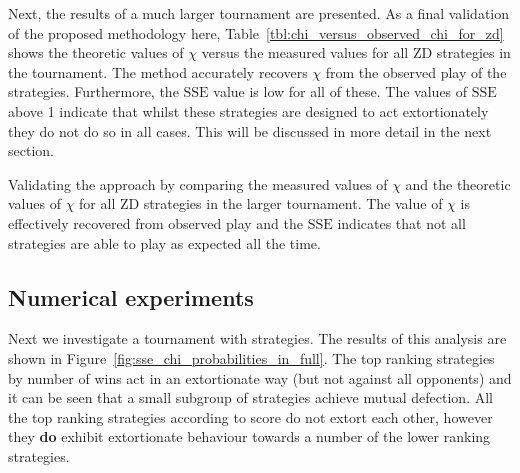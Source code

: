 \documentclass[a4paper]{article}
\newcommand{\SSe}{\text{SSE}}
\begin{document}
Next, the results of a much larger tournament are presented.
As a final validation of the proposed methodology here,
Table~\ref{tbl:chi_versus_observed_chi_for_zd} shows the theoretic values of
\(\chi\) versus the measured values for all ZD strategies in the tournament.
The method accurately recovers \(\chi\) from the observed play of
the strategies. Furthermore, the \(\SSe\) value is low for all of these. The
values of \(\SSe\) above 1 indicate that whilst these strategies are designed to
act extortionately they do not do so in all cases. This will be discussed in
more detail in the next section.

\begin{table}[!hbtp]
    \begin{center}
   
    \end{center}
    \caption{Validating the approach by comparing the measured values of
    \(\chi\) and the theoretic values of
    \(\chi\) for all ZD strategies in the larger tournament. The value of
    \(\chi\) is effectively recovered from observed play and the \(\SSe\)
    indicates that not all strategies are able to play as expected all the
time.}
    \label{tbl:chi_versus_observed_chi_for_zd}
\end{table}

\subsection{Numerical experiments}

Next we investigate a tournament with
strategies. The results of
this analysis are shown in Figure~\ref{fig:sse_chi_probabilities_in_full}. The
top ranking strategies by number of wins act in an extortionate way (but not
against all opponents) and it can be seen that a small subgroup of strategies
achieve mutual defection.  All the top ranking strategies according to score
do not extort each other, however they
\textbf{do} exhibit extortionate behaviour towards a number of the lower ranking
strategies.
\end{document}
